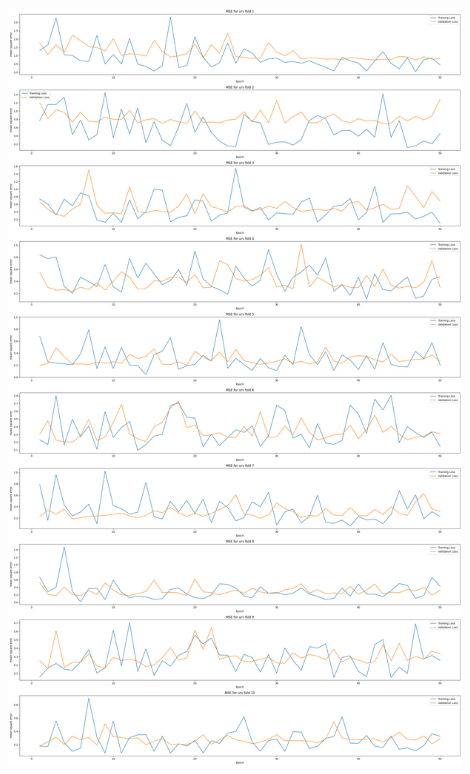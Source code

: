 \documentclass[11pt, a4paper]{article}
\begin{document}
    \begin{center}
        \includegraphics[width=0.9\textwidth]{GATGCN_folds10errors.png}
    \end{center}
\end{document}
